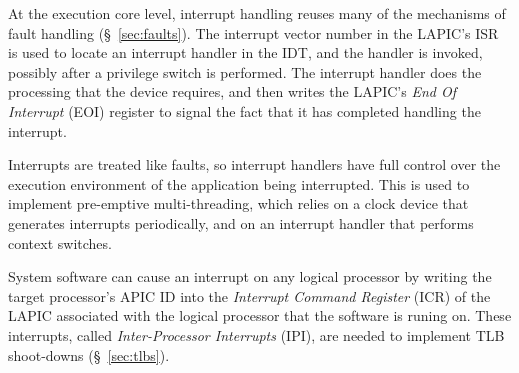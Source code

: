 
At the execution core level, interrupt handling reuses many of the mechanisms
of fault handling (\S~\ref{sec:faults}). The interrupt vector number in the
LAPIC's ISR is used to locate an interrupt handler in the IDT, and the handler
is invoked, possibly after a privilege switch is performed. The interrupt
handler does the processing that the device requires, and then writes the
LAPIC's \textit{End Of Interrupt} (EOI) register to signal the fact that it has
completed handling the interrupt.

Interrupts are treated like faults, so interrupt handlers have full control
over the execution environment of the application being interrupted. This is
used to implement pre-emptive multi-threading, which relies on a clock device
that generates interrupts periodically, and on an interrupt handler that
performs context switches.

System software can cause an interrupt on any logical processor by writing the
target processor's APIC ID into the \textit{Interrupt Command Register} (ICR)
of the LAPIC associated with the logical processor that the software is runing
on. These interrupts, called \textit{Inter-Processor Interrupts} (IPI), are
needed to implement TLB shoot-downs (\S~\ref{sec:tlbs}).
